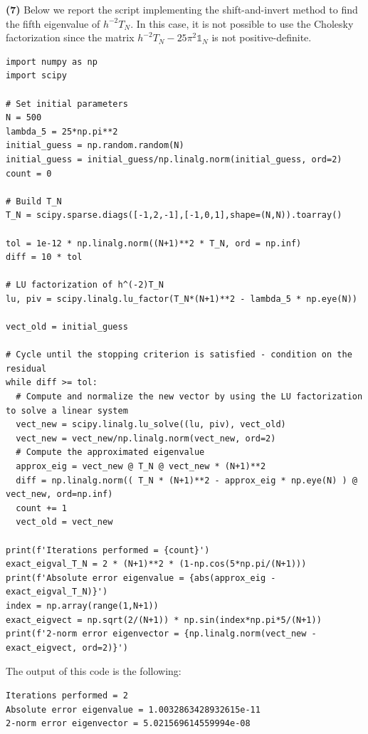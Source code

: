 \documentclass[a4paper,11pt]{article}
\begin{document}
\noindent \textbf{(7)} Below we report the script implementing the shift-and-invert method to find the fifth eigenvalue of $h^{-2}T_{N}$. In this case, it is not possible to use the Cholesky factorization since the matrix $h^{-2}T_{N} - 25\pi^2\mathbb{1}_{N}$ is not positive-definite.

\begin{verbatim}
import numpy as np
import scipy

# Set initial parameters
N = 500
lambda_5 = 25*np.pi**2
initial_guess = np.random.random(N)
initial_guess = initial_guess/np.linalg.norm(initial_guess, ord=2)
count = 0

# Build T_N
T_N = scipy.sparse.diags([-1,2,-1],[-1,0,1],shape=(N,N)).toarray()

tol = 1e-12 * np.linalg.norm((N+1)**2 * T_N, ord = np.inf)
diff = 10 * tol

# LU factorization of h^(-2)T_N
lu, piv = scipy.linalg.lu_factor(T_N*(N+1)**2 - lambda_5 * np.eye(N))

vect_old = initial_guess

# Cycle until the stopping criterion is satisfied - condition on the residual
while diff >= tol:
  # Compute and normalize the new vector by using the LU factorization to solve a linear system
  vect_new = scipy.linalg.lu_solve((lu, piv), vect_old)  
  vect_new = vect_new/np.linalg.norm(vect_new, ord=2)
  # Compute the approximated eigenvalue
  approx_eig = vect_new @ T_N @ vect_new * (N+1)**2
  diff = np.linalg.norm(( T_N * (N+1)**2 - approx_eig * np.eye(N) ) @ vect_new, ord=np.inf)
  count += 1
  vect_old = vect_new

print(f'Iterations performed = {count}')
exact_eigval_T_N = 2 * (N+1)**2 * (1-np.cos(5*np.pi/(N+1)))
print(f'Absolute error eigenvalue = {abs(approx_eig - exact_eigval_T_N)}')
index = np.array(range(1,N+1))
exact_eigvect = np.sqrt(2/(N+1)) * np.sin(index*np.pi*5/(N+1))
print(f'2-norm error eigenvector = {np.linalg.norm(vect_new - exact_eigvect, ord=2)}')
\end{verbatim}

\noindent The output of this code is the following:
\begin{verbatim}
Iterations performed = 2
Absolute error eigenvalue = 1.0032863428932615e-11
2-norm error eigenvector = 5.021569614559994e-08
\end{verbatim}
\end{document}
